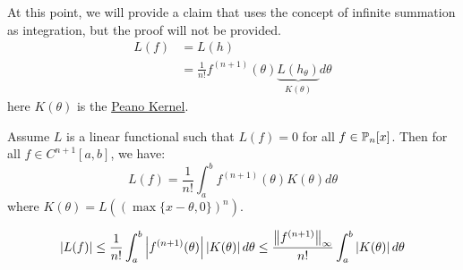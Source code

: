 \documentclass[../Main.tex]{subfiles}
\begin{document}
At this point, we will provide a claim that uses the concept of infinite summation as integration, but the proof will not be provided.
\begin{align*}
    L(f) &= L(h) \\
    &= \frac{1}{n!} f^{(n+1)}(\theta) \underbrace{L(h_\theta)}_{K(\theta)} d\theta
\end{align*}
here $K(\theta)$ is the \underline{Peano Kernel}.
\begin{theorem}
    Assume $L$ is a linear functional such that $L(f) = 0$ for all $f \in \P_n[x]$. Then for all $f \in C^{n+1}[a, b]$, we have:
    \begin{equation}
        L(f) = \frac{1}{n!} \int_{a}^{b} f^{(n+1)}(\theta) K(\theta) d\theta
        \label{eqnPeanoKernel}
    \end{equation}
    where $K(\theta) = L\left(\left(\max\{x - \theta, 0\}\right)^n\right)$.
    \label{thmPeanoKernel}
\end{theorem}
\begin{corollary}
    \begin{equation*}
        |L(f)| \leq \frac{1}{n!} \int_{a}^{b} \abs{f^{(n+1)}(\theta)} \abs{K(\theta)} d\theta \leq \frac{\norm{f^{(n+1)}}_\infty}{n!} \int_{a}^{b} \abs{K(\theta)} d\theta 
    \end{equation*}
    \label{corPeanoKernelBound}
\end{corollary}
\end{document}
